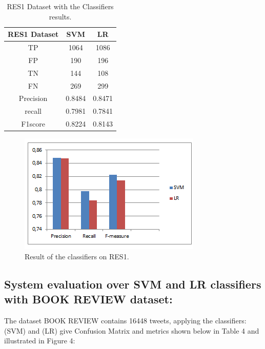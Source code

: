 \documentclass[conference]{IEEEtran}
\begin{document}
	\begin{table}[!ht]
		\large        %
		\caption{RES1 Dataset with the Classifiers results.}\label{label}
		\centering    %
		\begin{tabular}{|c|c|c|}
			\hline
			RES1 Dataset&SVM&LR\\     %
			\hline
			TP&1064&1086\\
			\hline
			FP&190&196\\
			\hline
			TN&144&108\\
			\hline
			FN&269&299\\
			\hline
			Precision&0.8484&0.8471\\
			\hline
			recall&0.7981&0.7841\\
			\hline
			F1score&0.8224&0.8143\\
			\hline
		\end{tabular}
	\end{table}
	
	\begin{figure}[htbp]
		
		\centerline{\includegraphics{fig3.png}}
		\caption{Result of the classifiers on RES1.}
		\label{fig}
	\end{figure}
	\subsection{System evaluation over SVM and LR classifiers with BOOK REVIEW dataset:}\label{AA}
	The dataset BOOK REVIEW contains 16448 tweets, applying the classifiers: (SVM) and (LR) give Confusion Matrix and metrics shown below in Table 4 and illustrated in Figure 4:
	
\end{document}
